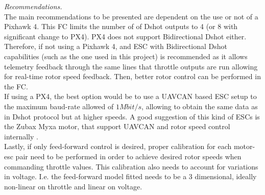 \textit{Recommendations. } \\
The main recommendations to be presented are dependent on the use or not of a Pixhawk 4. This FC limits the number of of Dshot outputs to 4 (or 8 with significant change to PX4). PX4 does not support Bidirectional Dshot either.\\

Therefore, if not using a Pixhawk 4, and ESC with Bidirectional Dshot capabilities (such as the one used in this project) is recommended as it allows telemetry feedback through the same lines that throttle outputs are run allowing for real-time rotor speed feedback. Then, better rotor control can be performed in the FC.\\

If using a PX4, the best option would be to use a UAVCAN based ESC setup to the maximum baud-rate allowed of $1Mbit/s$, allowing to obtain the same data as in Dshot protocol but at higher speeds. A good suggestion of this kind of ESCs is the Zubax Myxa motor, that support UAVCAN and rotor speed control internally \cite{Zubax-Robotics2015}.\\

Lastly, if only feed-forward control is desired, proper calibration for each motor-esc pair need to be performed in order to achieve desired rotor speeds when commanding throttle values. This calibration also needs to account for variations in voltage. I.e. the feed-forward model fitted needs to be a 3 dimensional, ideally non-linear on throttle and linear on voltage.
